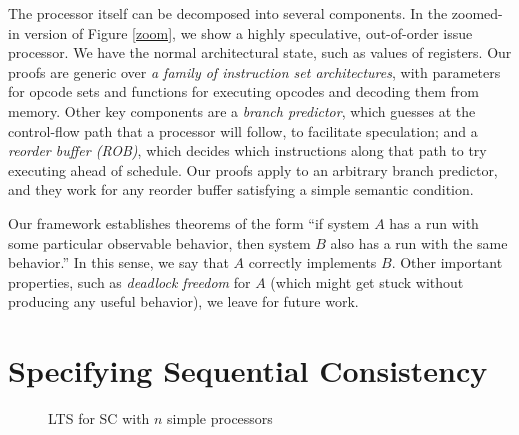 The processor itself can be decomposed into several components. In the
zoomed-in version of Figure \ref{zoom}, we show a highly speculative,
out-of-order issue processor. We have the normal architectural state, such as
values of registers.  Our proofs are generic over \emph{a family of instruction
set architectures}, with parameters for opcode sets and functions for executing
opcodes and decoding them from memory.  Other key components are a \emph{branch
predictor}, which guesses at the control-flow path that a processor will
follow, to facilitate speculation; and a \emph{reorder buffer (ROB)}, which
decides which instructions along that path to try executing ahead of schedule.
Our proofs apply to an arbitrary branch predictor, and they work for any
reorder buffer satisfying a simple semantic condition.


Our framework establishes theorems of the form ``if system $A$ has a run with
some particular observable behavior, then system $B$ also has a run with the
same behavior.''  In this sense, we say that $A$ correctly implements $B$.
Other important properties, such as \emph{deadlock freedom} for $A$ (which
might get stuck without producing any useful behavior), we leave for future
work.

\section{Specifying Sequential Consistency}\label{sec:sc}

\begin{figure}
\small
\centering
\begin{boxedminipage}[c]{.48\textwidth}
{}
{}

{}

{}

{}
\end{boxedminipage}
\caption{LTS for SC with $n$ simple processors}
\label{Ref}
\end{figure}

